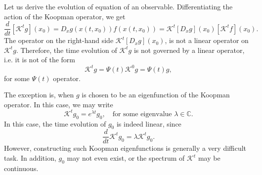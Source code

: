 Let us derive the evolution of equation of an observable. Differentiating the action of the Koopman operator, we get
\begin{equation}
\frac{d}{dt}\left[\mathcal{K}^t g\right](x_0) = D_x g(x(t,x_0)) f(x(t,x_0)) =\mathcal{K}^t \left[D_x g\right](x_0) \left[\mathcal{K}^t f\right](x_0).
\end{equation}
The operator on the right-hand side $\mathcal{K}^t \left[D_x g\right](x_0)$, is not a linear operator on $\mathcal{K}^t g$. Therefore, the time evolution of $\mathcal{K}^t g$ is not governed by a linear operator, i.e. it is not of the form 
\begin{equation}
\mathcal{K}^t g = \Psi(t)\mathcal{K}^0 g = \Psi(t) g,
\end{equation}
for some $\Psi(t)$ operator. 

The exception is, when $g$ is chosen to be an eigenfunction of the Koopman operator. In this case, we may write
\begin{equation}
\mathcal{K}^t g_0 = e^{\lambda t}g_0, \quad \text{for some eigenvalue } \lambda\in \mathbb{C}.
\end{equation}
In this case, the time evolution of $g_0$ is indeed linear, since
\begin{equation}
\frac{d}{dt}\mathcal{K}^t g_0 = \lambda \mathcal{K}^t g_0.
\end{equation}
However, constructing such Koopman eigenfunctions is generally a very difficult task. In addition, $g_0$ may not even exist, or the spectrum of $\mathcal{K}^t$ may be continuous. 
